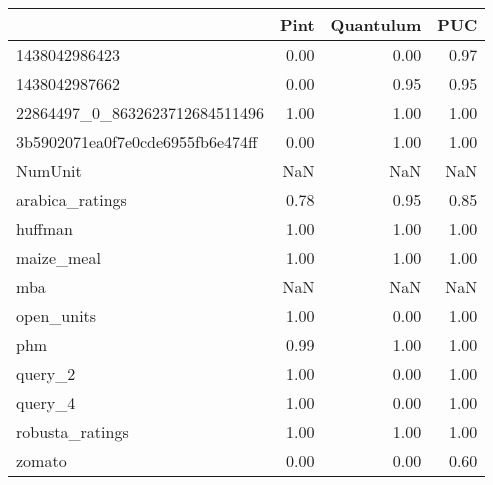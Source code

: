 \begin{tabular}{lrrr}
\toprule
{} &  Pint &  Quantulum &   PUC \\
\midrule
1438042986423                    &  0.00 &       0.00 &  0.97 \\
1438042987662                    &  0.00 &       0.95 &  0.95 \\
22864497\_0\_8632623712684511496   &  1.00 &       1.00 &  1.00 \\
3b5902071ea0f7e0cde6955fb6e474ff &  0.00 &       1.00 &  1.00 \\
NumUnit                          &   NaN &        NaN &   NaN \\
arabica\_ratings                  &  0.78 &       0.95 &  0.85 \\
huffman                          &  1.00 &       1.00 &  1.00 \\
maize\_meal                       &  1.00 &       1.00 &  1.00 \\
mba                              &   NaN &        NaN &   NaN \\
open\_units                       &  1.00 &       0.00 &  1.00 \\
phm                              &  0.99 &       1.00 &  1.00 \\
query\_2                          &  1.00 &       0.00 &  1.00 \\
query\_4                          &  1.00 &       0.00 &  1.00 \\
robusta\_ratings                  &  1.00 &       1.00 &  1.00 \\
zomato                           &  0.00 &       0.00 &  0.60 \\
\bottomrule
\end{tabular}
